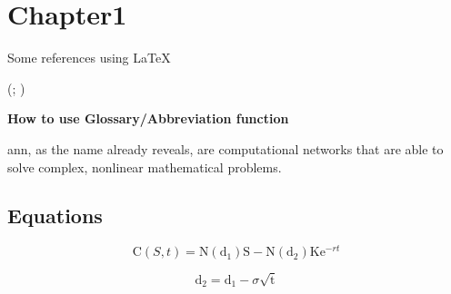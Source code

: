 \section{Chapter1}
	\label{sec:chapter1}

	Some references using \LaTeX

	\citet{de1998little}

	\citet[p.~34]{de1998little}

	\citep{de1998little}

	\citep[p.~34]{de1998little}

	\citep{de1998little,bieger2013}

	(\citealp[p.~3]{de1998little}; \citealp[p.~5]{bieger2013})

	\citep[e.g.][p.~34]{de1998little}

	\textbf{How to use Glossary/Abbreviation function}

\gls{ann}, as the name already reveals, are computational networks that are able to solve complex, nonlinear mathematical problems.

\subsection{Equations}
	\label{subsec:equ}


	\begin{equation}
	\mathrm C( S, t)= \mathrm N(\mathrm d_1)\mathrm S - \mathrm N(\mathrm d_2) \mathrm K \mathrm e^{-rt}
	\label{eq:1}
	\end{equation}

	\begin{equation}
	\mathrm d_2= \mathrm d_1 - \sigma \sqrt{\mathrm t}
	\label{eq:3}
	\end{equation}

	\newpage
